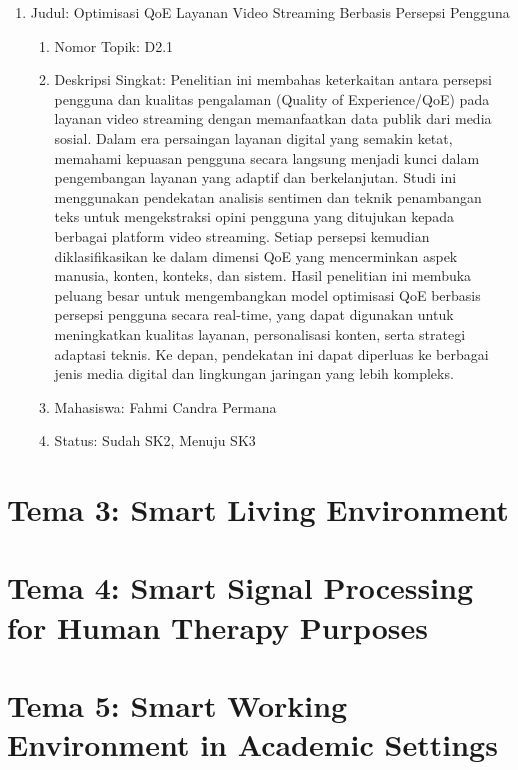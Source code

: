 \documentclass[
  letterpaper,
  DIV=11,
  numbers=noendperiod]{scrreprt}
\begin{document}
\begin{enumerate}
\def\labelenumi{\arabic{enumi}.}
\item
  Judul: Optimisasi QoE Layanan Video Streaming Berbasis Persepsi
  Pengguna

  \begin{enumerate}
  \def\labelenumii{\arabic{enumii}.}
  \item
    Nomor Topik: D2.1
  \item
    Deskripsi Singkat: Penelitian ini membahas keterkaitan antara
    persepsi pengguna dan kualitas pengalaman (Quality of
    Experience/QoE) pada layanan video streaming dengan memanfaatkan
    data publik dari media sosial. Dalam era persaingan layanan digital
    yang semakin ketat, memahami kepuasan pengguna secara langsung
    menjadi kunci dalam pengembangan layanan yang adaptif dan
    berkelanjutan. Studi ini menggunakan pendekatan analisis sentimen
    dan teknik penambangan teks untuk mengekstraksi opini pengguna yang
    ditujukan kepada berbagai platform video streaming. Setiap persepsi
    kemudian diklasifikasikan ke dalam dimensi QoE yang mencerminkan
    aspek manusia, konten, konteks, dan sistem. Hasil penelitian ini
    membuka peluang besar untuk mengembangkan model optimisasi QoE
    berbasis persepsi pengguna secara real-time, yang dapat digunakan
    untuk meningkatkan kualitas layanan, personalisasi konten, serta
    strategi adaptasi teknis. Ke depan, pendekatan ini dapat diperluas
    ke berbagai jenis media digital dan lingkungan jaringan yang lebih
    kompleks.
  \item
    Mahasiswa: Fahmi Candra Permana
  \item
    Status: Sudah SK2, Menuju SK3
  \end{enumerate}
\end{enumerate}

\section{Tema 3: Smart Living
Environment}\label{tema-3-smart-living-environment}

\section{Tema 4: Smart Signal Processing for Human Therapy
Purposes}\label{tema-4-smart-signal-processing-for-human-therapy-purposes}

\section{Tema 5: Smart Working Environment in Academic
Settings}\label{tema-5-smart-working-environment-in-academic-settings}
\end{document}
